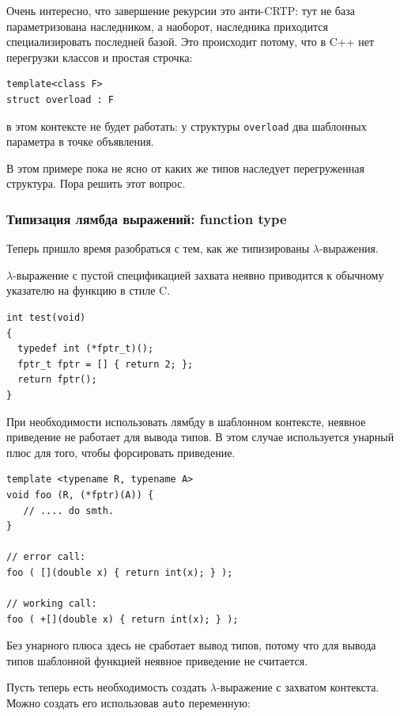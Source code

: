 \documentclass[a4paper,12pt,oneside]{article}
\begin{document}
Очень интересно, что завершение рекурсии это анти-CRTP: тут не база параметризована наследником, а наоборот, наследника приходится специализировать последней базой. Это происходит потому, что в C++ нет перегрузки классов и простая строчка:

\begin{lstlisting}
template<class F>
struct overload : F
\end{lstlisting}

в этом контексте не будет работать: у структуры \lstinline!overload! два шаблонных параметра в точке объявления.

В этом примере пока не ясно от каких же типов наследует перегруженная структура. Пора решить этот вопрос.

\subsubsection{Типизация лямбда выражений: function type}\label{StdFunction}

Теперь пришло время разобраться с тем, как же типизированы $\lambda$-выражения.

$\lambda$-выражение с пустой спецификацией захвата неявно приводится к обычному указателю на функцию в стиле C.

\begin{lstlisting}
int test(void)
{
  typedef int (*fptr_t)();
  fptr_t fptr = [] { return 2; };
  return fptr();
}
\end{lstlisting}

При необходимости использовать лямбду в шаблонном контексте, неявное приведение не работает для вывода типов. В этом случае используется унарный плюс для того, чтобы форсировать приведение.

\begin{lstlisting}
template <typename R, typename A>
void foo (R, (*fptr)(A)) {
   // .... do smth.
}

// error call:
foo ( [](double x) { return int(x); } );

// working call:
foo ( +[](double x) { return int(x); } );
\end{lstlisting}

Без унарного плюса здесь не сработает вывод типов, потому что для вывода типов шаблонной функцией неявное приведение не считается.

Пусть теперь есть необходимость создать $\lambda$-выражение с захватом контекста. Можно создать его использовав \lstinline!auto! переменную:
\end{document}
